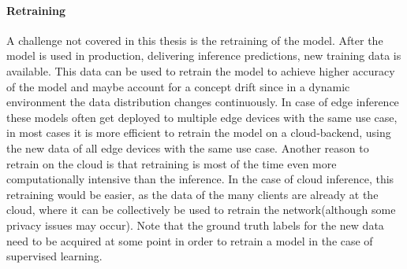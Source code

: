 \paragraph{Retraining}
A challenge not covered in this thesis is the retraining of the model. After the model is used in production, delivering inference predictions, new training data is available. This data can be used to retrain the model to achieve higher accuracy of the model and maybe account for a concept drift since in a dynamic environment the data distribution changes continuously.
In case of edge inference these models often get deployed to multiple edge devices with the same use case, in most cases it is more efficient to retrain the model on a cloud-backend, using the new data of all edge devices with the same use case. Another reason to retrain on the cloud is that retraining is most of the time even more computationally intensive than the inference.
In the case of cloud inference, this retraining would be easier, as the data of the many clients are already at the cloud, where it can be collectively be used to retrain the network(although some privacy issues may occur).
Note that the ground truth labels for the new data need to be acquired at some point in order to retrain a model in the case of supervised learning.
\endinput 
